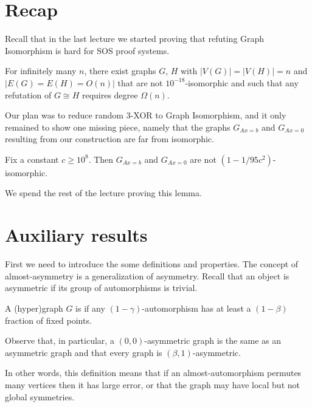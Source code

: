 \documentclass[a4paper,twoside,justified]{tufte-handout}
\newcommand{\PS}{\proofsystem{PC$_>$}}
\newcommand{\Glin}[1]{G_{Ax=#1}}
\begin{document}
 

\section{Recap}

Recall that in the last lecture we started proving that refuting Graph Isomorphism is hard for SOS proof systems.

\begin{theorem}\cite{o2014hardness}
  \label{th:gi-ps}
  For infinitely many $n$, there exist graphs $G$, $H$ with $|V(G)|=|V(H)|=n$ and $|E(G)=E(H)=O(n)|$ that are not $10^{-18}$-isomorphic and such that any \PS refutation of $G \cong H$ requires degree $\Omega(n)$.
\end{theorem}

Our plan was to reduce random 3-XOR to Graph Isomorphism, and it only remained to show one missing piece, namely that the graphs $\Glin{b}$ and $\Glin{0}$ resulting from our construction are far from isomorphic.

\begin{lemma}
  \label{lem:non-isomorphic}
  Fix a constant $c \geq 10^8$. Then \whp $\Glin{b}$ and $\Glin{0}$ are not $(1-1/95c^2)$-isomorphic.
\end{lemma}

We spend the rest of the lecture proving this lemma.

\section{Auxiliary results}

First we need to introduce the some definitions and properties. The concept of almost-asymmetry is a generalization of asymmetry. Recall that an object is asymmetric if its group of automorphisms is trivial.

\begin{definition}
  \label{def:asymmetry} A (hyper)graph $G$ is  if any $(1-\gamma)$-automorphism has at least a $(1-\beta)$ fraction of fixed points.
\end{definition}

Observe that, in particular, a $(0,0)$-asymmetric graph is the same as an asymmetric graph and that every graph is $(\beta,1)$-asymmetric.

In other words, this definition means that if an almost-automorphism permutes many vertices then it has large error, or that the graph may have local but not global symmetries.
\end{document}
